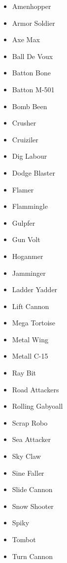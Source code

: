 \begin{itemize}
	\item \hypertarget{enem:Amenhopper}{Amenhopper}
	\item \hypertarget{enem:Armor_Soldier}{Armor Soldier}
	\item \hypertarget{enem:Axe_Max}{Axe Max}
	\item \hypertarget{enem:Ball_De_Voux}{Ball De Voux}
	\item \hypertarget{enem:Batton_Bone}{Batton Bone}
	\item \hypertarget{enem:Batton_M-501}{Batton M-501} 
	\item \hypertarget{enem:Bomb_Been}{Bomb Been}
	\item \hypertarget{enem:Crusher}{Crusher}
	\item \hypertarget{enem:Cruiziler}{Cruiziler}
	\item \hypertarget{enem:Dig_Labour}{Dig Labour}
	\item \hypertarget{enem:Dodge_Blaster}{Dodge Blaster}
	\item \hypertarget{enem:Flamer}{Flamer} 
	\item \hypertarget{enem:Flammingle}{Flammingle}
	\item \hypertarget{enem:Gulpfer}{Gulpfer}
	\item \hypertarget{enem:Gun_Volt}{Gun Volt}
	\item \hypertarget{enem:Hoganmer}{Hoganmer}
	\item \hypertarget{enem:Jamminger}{Jamminger}
	\item \hypertarget{enem:Ladder_Yadder}{Ladder Yadder}
	\item \hypertarget{enem:Lift Cannon}{Lift Cannon}
	\item \hypertarget{enem:Mega_Tortoise}{Mega Tortoise}
	\item \hypertarget{enem:Metal_Wing}{Metal Wing}
	\item \hypertarget{enem:Metall_C-15}{Metall C-15} 
	\item \hypertarget{enem:Ray_Bit}{Ray Bit}
	\item \hypertarget{enem:Road_Attackers}{Road Attackers}
	\item \hypertarget{enem:Rolling_Gabyoall}{Rolling Gabyoall}
	\item \hypertarget{enem:Scrap_Robo}{Scrap Robo}
	\item \hypertarget{enem:Sea_Attacker}{Sea Attacker}
	\item \hypertarget{enem:Sky_Claw}{Sky Claw}
	\item \hypertarget{enem:Sine_Faller}{Sine Faller}
	\item \hypertarget{enem:Slide_Cannon}{Slide Cannon}
	\item \hypertarget{enem:Snow_Shooter}{Snow Shooter}
	\item \hypertarget{enem:Spiky}{Spiky}
	\item \hypertarget{enem:Tombot}{Tombot}
	\item \hypertarget{enem:Turn_Cannon}{Turn Cannon}

\end{itemize}
